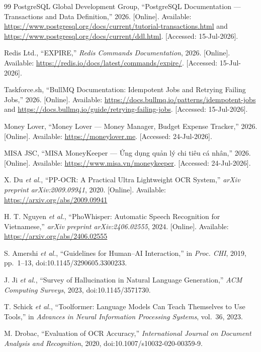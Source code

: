 \begin{thebibliography}{99}
PostgreSQL Global Development Group, ``PostgreSQL Documentation --- Transactions and Data Definition,'' 2026. [Online]. Available: \url{https://www.postgresql.org/docs/current/tutorial-transactions.html} and \url{https://www.postgresql.org/docs/current/ddl.html}. [Accessed: 15-Jul-2026].

Redis Ltd., ``EXPIRE,'' \emph{Redis Commands Documentation}, 2026. [Online]. Available: \url{https://redis.io/docs/latest/commands/expire/}. [Accessed: 15-Jul-2026].

Taskforce.sh, ``BullMQ Documentation: Idempotent Jobs and Retrying Failing Jobs,'' 2026. [Online]. Available: \url{https://docs.bullmq.io/patterns/idempotent-jobs} and \url{https://docs.bullmq.io/guide/retrying-failing-jobs}. [Accessed: 15-Jul-2026].

Money Lover, ``Money Lover --- Money Manager, Budget Expense Tracker,'' 2026. [Online]. Available: \url{https://moneylover.me}. [Accessed: 24-Jul-2026].

MISA JSC, ``MISA MoneyKeeper --- Ứng dụng quản lý chi tiêu cá nhân,'' 2026. [Online]. Available: \url{https://www.misa.vn/moneykeeper}. [Accessed: 24-Jul-2026].

X. Du \emph{et al.}, ``PP-OCR: A Practical Ultra Lightweight OCR System,'' \emph{arXiv preprint arXiv:2009.09941}, 2020. [Online]. Available: \url{https://arxiv.org/abs/2009.09941}

H. T. Nguyen \emph{et al.}, ``PhoWhisper: Automatic Speech Recognition for Vietnamese,'' \emph{arXiv preprint arXiv:2406.02555}, 2024. [Online]. Available: \url{https://arxiv.org/abs/2406.02555}

S. Amershi \emph{et al.}, ``Guidelines for Human--AI Interaction,'' in \emph{Proc. CHI}, 2019, pp.~1--13, doi:10.1145/3290605.3300233.

J. Ji \emph{et al.}, ``Survey of Hallucination in Natural Language Generation,'' \emph{ACM Computing Surveys}, 2023, doi:10.1145/3571730.

T. Schick \emph{et al.}, ``Toolformer: Language Models Can Teach Themselves to Use Tools,'' in \emph{Advances in Neural Information Processing Systems}, vol.~36, 2023.

M. Drobac, ``Evaluation of OCR Accuracy,'' \emph{International Journal on Document Analysis and Recognition}, 2020, doi:10.1007/s10032-020-00359-9.


\end{thebibliography}
